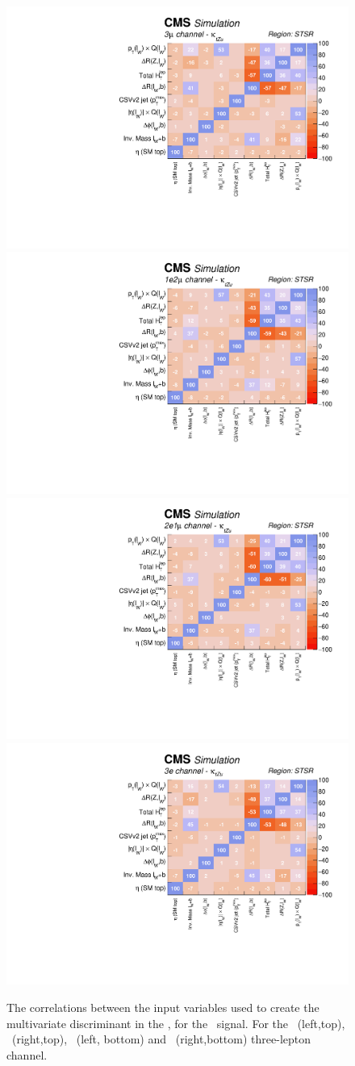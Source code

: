 \begin{figure}[htbp]
	\centering
	\includegraphics[width=0.49\linewidth]{6_Search/Figures/PlotsTechnics/correlationsigZutsingletopuuu}
	\includegraphics[width=0.49\linewidth]{6_Search/Figures/PlotsTechnics/correlationsigZutsingletopuue}
	\includegraphics[width=0.49\linewidth]{6_Search/Figures/PlotsTechnics/correlationsigZutsingletopeeu}
	\includegraphics[width=0.49\linewidth]{6_Search/Figures/PlotsTechnics/correlationsigZutsingletopeee}
	\caption{The correlations between the input variables used to create the multivariate discriminant in the \STSR, for the \Zut\ signal. For the \mumumu\ (left,top), \emumu\ (right,top), \eemu\ (left, bottom) and \eee\ (right,bottom) three-lepton channel.}
	\label{fig:correlationsigzutsingletop}
\end{figure}

